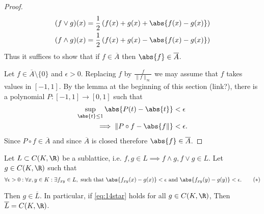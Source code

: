 \documentclass{article}
\begin{document}
\begin{proof}
    \begin{align*}
        (f \vee g)(x) &= \frac{1}{2}\left(f(x) + g(x) + \abs{f(x) - g(x)}\right) \\
        (f \wedge g)(x) &= \frac{1}{2}\left(f(x) + g(x) - \abs{f(x) - g(x)}\right) \\
    \end{align*}
    Thus it suffices to show that if $f \in \overline{A}$ then $\abs{f} \in \overline{A}$.

    Let $f \in \overline{A} \setminus \{0\}$ and $\epsilon > 0$.
    Replacing $f$ by $\frac{f}{\|f\|_\infty}$ we may assume that $f$ takes values in $[-1, 1]$.
    By the lemma at the beginning of this section (link?), there is a polynomial $P: [-1, 1] \to [0, 1]$ such that
    \begin{align*}
        \sup_{\abs{t} \leq 1} \abs{P(t) - \abs{t}} &< \epsilon \\
        \implies \|P \circ f - \abs{f\|} &< \epsilon.
    \end{align*}
    Since $P \circ f \in \overline{A}$ and since $\overline{A}$ is closed therefore $\abs{f} \in \overline{A}$.
\end{proof}


\begin{lemma}
    Let $L \subset C(K, \R)$ be a sublattice, i.e. $f,g \in L \implies f \wedge g, f \vee g \in L$.
    Let $g \in C(K, \R)$ such that
    \begin{equation*}
        \forall \epsilon > 0: \forall x, y \in K: \exists f_{xy} \in L, \text{ such that } \abs{f_{xy}(x) - g(x)} < \epsilon \text{ and } \abs{f_{xy}(y) - g(y)} < \epsilon. \label{eq:14star} \tag{$*$}
    \end{equation*}

    Then $g \in \overline{L}$. In particular, if \eqref{eq:14star} holds for all $g \in C(K, \R)$, Then $\overline{L} = C(K, \R)$.
\end{lemma}
\end{document}
